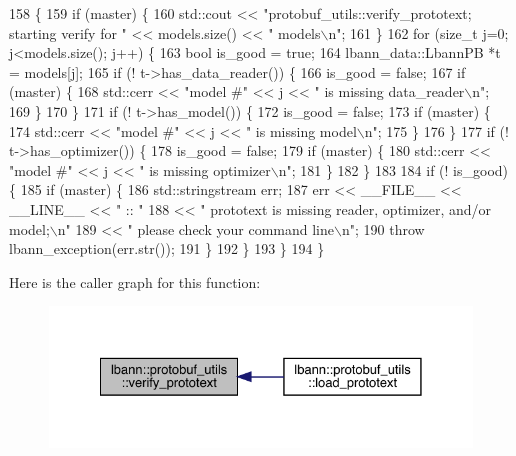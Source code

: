 \begin{DoxyCode}
158                                                                                                \{
159   \textcolor{keywordflow}{if} (master) \{
160     std::cout << \textcolor{stringliteral}{"protobuf\_utils::verify\_prototext; starting verify for "} << models.size() << \textcolor{stringliteral}{" models\(\backslash\)n"};
161   \}
162   \textcolor{keywordflow}{for} (\textcolor{keywordtype}{size\_t} j=0; j<models.size(); j++) \{
163     \textcolor{keywordtype}{bool} is\_good = \textcolor{keyword}{true};
164     lbann\_data::LbannPB *t = models[j];
165     \textcolor{keywordflow}{if} (! t->has\_data\_reader()) \{
166       is\_good = \textcolor{keyword}{false};
167       \textcolor{keywordflow}{if} (master) \{
168         std::cerr << \textcolor{stringliteral}{"model #"} << j << \textcolor{stringliteral}{" is missing data\_reader\(\backslash\)n"};
169       \}
170     \}
171     \textcolor{keywordflow}{if} (! t->has\_model()) \{
172       is\_good = \textcolor{keyword}{false};
173       \textcolor{keywordflow}{if} (master) \{
174         std::cerr << \textcolor{stringliteral}{"model #"} << j << \textcolor{stringliteral}{" is missing model\(\backslash\)n"};
175       \}
176     \}
177     \textcolor{keywordflow}{if} (! t->has\_optimizer()) \{
178       is\_good = \textcolor{keyword}{false};
179       \textcolor{keywordflow}{if} (master) \{
180         std::cerr << \textcolor{stringliteral}{"model #"} << j << \textcolor{stringliteral}{" is missing optimizer\(\backslash\)n"};
181       \}
182     \}
183 
184     \textcolor{keywordflow}{if} (! is\_good) \{
185       \textcolor{keywordflow}{if} (master) \{
186         std::stringstream err;
187         err << \_\_FILE\_\_ << \_\_LINE\_\_ << \textcolor{stringliteral}{" :: "}
188             << \textcolor{stringliteral}{" prototext is missing reader, optimizer, and/or model;\(\backslash\)n"}
189             << \textcolor{stringliteral}{" please check your command line\(\backslash\)n"};
190         \textcolor{keywordflow}{throw} lbann\_exception(err.str());    
191       \}
192     \}
193   \}
194 \}
\end{DoxyCode}
Here is the caller graph for this function\+:\nopagebreak
\begin{figure}[H]
\begin{center}
\leavevmode
\includegraphics[width=328pt]{classlbann_1_1protobuf__utils_a058d524e15fb811e0d193ffb308c5faf_icgraph}
\end{center}
\end{figure}


